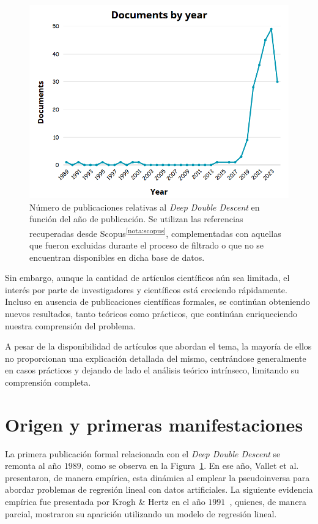 \begin{figure}[h]
    \centering
    \includegraphics[width=0.7\linewidth]{img/scopus_histogram.png}
    \caption[Número de publicaciones relativas al \textit{Deep Double Descent} en función del año de publicación.] {Número de publicaciones relativas al \textit{Deep Double Descent} en función del año de publicación. Se utilizan las referencias recuperadas desde Scopus\textsuperscript{\ref{nota:scopus}}, complementadas con aquellas que fueron excluidas durante el proceso de filtrado o que no se encuentran disponibles en dicha base de datos.}\label{fig:histogram}
\end{figure}

Sin embargo, aunque la cantidad de artículos científicos aún sea limitada, el interés por parte de investigadores y científicos está creciendo rápidamente. Incluso en ausencia de publicaciones científicas formales, se continúan obteniendo nuevos resultados, tanto teóricos como prácticos, que continúan enriqueciendo nuestra comprensión del problema.

A pesar de la disponibilidad de artículos que abordan el tema, la mayoría de ellos no proporcionan una explicación detallada del mismo, centrándose generalmente en casos prácticos y dejando de lado el análisis teórico intrínseco, limitando su comprensión completa.

\section{Origen y primeras manifestaciones}\label{}

La primera publicación formal relacionada con el \textit{Deep Double Descent} se remonta al año $1989$, como se observa en la Figura~\ref{fig:histogram}. En ese año, Vallet et al.~\cite{Vallet1989} presentaron, de manera empírica, esta dinámica al emplear la pseudoinversa para abordar problemas de regresión lineal con datos artificiales. La siguiente evidencia empírica fue presentada por Krogh \& Hertz en el año $1991$~\cite{Krogh1991}, quienes, de manera parcial, mostraron su aparición utilizando un modelo de regresión lineal.

